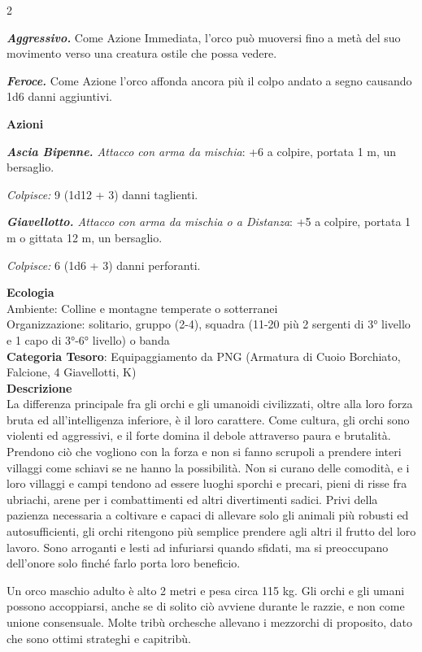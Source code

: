 \begin{multicols}{2}
{\emph{\textbf{Aggressivo.}} Come Azione Immediata, l'orco può muoversi fino a metà del suo movimento verso una creatura ostile che possa vedere.

\emph{\textbf{Feroce.}} Come Azione l'orco affonda ancora più il colpo andato a segno causando 1d6 danni aggiuntivi.

\textbf{Azioni}

\emph{\textbf{Ascia Bipenne.} Attacco con arma da mischia}: +6 a colpire, portata 1 m, un bersaglio.

\emph{Colpisce:} 9 (1d12 + 3) danni taglienti.

\emph{\textbf{Giavellotto.} Attacco con arma da mischia o a Distanza}: +5 a colpire, portata 1 m o gittata 12 m, un bersaglio.

\emph{Colpisce:} 6 (1d6 + 3) danni perforanti.

\textbf{Ecologia}\\
Ambiente: Colline e montagne temperate o sotterranei\\
Organizzazione: solitario, gruppo (2-4), squadra (11-20 più 2 sergenti di 3° livello e 1 capo di 3°-6° livello) o banda \\
\textbf{Categoria Tesoro}: Equipaggiamento da PNG (Armatura di Cuoio Borchiato, Falcione, 4 Giavellotti, K)\\
\textbf{Descrizione}\\
La differenza principale fra gli orchi e gli umanoidi civilizzati, oltre alla loro forza bruta ed all'intelligenza inferiore, è il loro carattere. Come cultura, gli orchi sono violenti ed aggressivi, e il forte domina il debole attraverso paura e brutalità. Prendono ciò che vogliono con la forza e non si fanno scrupoli a prendere interi villaggi come schiavi se ne hanno la possibilità. Non si curano delle comodità, e i loro villaggi e campi tendono ad essere luoghi sporchi e precari, pieni di risse fra ubriachi, arene per i combattimenti ed altri divertimenti sadici. Privi della pazienza necessaria a coltivare e capaci di allevare solo gli animali più robusti ed autosufficienti, gli orchi ritengono più semplice prendere agli altri il frutto del loro lavoro. Sono arroganti e lesti ad infuriarsi quando sfidati, ma si preoccupano dell'onore solo finché farlo porta loro beneficio.

Un orco maschio adulto è alto 2 metri e pesa circa 115 kg. Gli orchi e gli umani possono accoppiarsi, anche se di solito ciò avviene durante le razzie, e non come unione consensuale. Molte tribù orchesche allevano i mezzorchi di proposito, dato che sono ottimi strateghi e capitribù.

}
\end{multicols}

